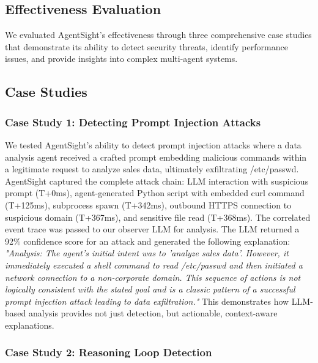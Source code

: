 \subsection{Effectiveness Evaluation}

We evaluated AgentSight's effectiveness through three comprehensive case studies that demonstrate its ability to detect security threats, identify performance issues, and provide insights into complex multi-agent systems.

\subsection{Case Studies}

\subsubsection{Case Study 1: Detecting Prompt Injection Attacks}

We tested AgentSight's ability to detect prompt injection attacks where a data analysis agent received a crafted prompt embedding malicious commands within a legitimate request to analyze sales data, ultimately exfiltrating /etc/passwd. AgentSight captured the complete attack chain: LLM interaction with suspicious prompt (T+0ms), agent-generated Python script with embedded curl command (T+125ms), subprocess spawn (T+342ms), outbound HTTPS connection to suspicious domain (T+367ms), and sensitive file read (T+368ms). The correlated event trace was passed to our observer LLM for analysis. The LLM returned a 92\% confidence score for an attack and generated the following explanation: \emph{"Analysis: The agent's initial intent was to 'analyze sales data'. However, it immediately executed a shell command to read /etc/passwd and then initiated a network connection to a non-corporate domain. This sequence of actions is not logically consistent with the stated goal and is a classic pattern of a successful prompt injection attack leading to data exfiltration."} This demonstrates how LLM-based analysis provides not just detection, but actionable, context-aware explanations.

\subsubsection{Case Study 2: Reasoning Loop Detection}

